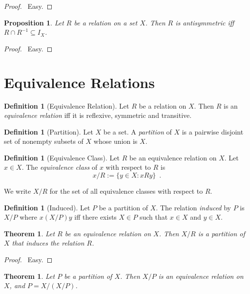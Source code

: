 \documentclass{report}
\let\qed\relax
\newtheorem{prop}[ax]{Proposition}
\newtheorem{thm}[ax]{Theorem}
\theoremstyle{definition}
\newtheorem{df}[ax]{Definition}
\begin{document}
\begin{proof}
\pf\ Easy. \qed
\end{proof}

\begin{prop}
Let $R$ be a relation on a set $X$. Then $R$ is antisymmetric iff $R \cap R^{-1} \subseteq I_X$.
\end{prop}

\begin{proof}
\pf\ Easy. \qed
\end{proof}

\section{Equivalence Relations}

\begin{df}[Equivalence Relation]
Let $R$ be a relation on $X$. Then $R$ is an \emph{equivalence relation} iff it is reflexive, symmetric and transitive.
\end{df}

\begin{df}[Partition]
Let $X$ be a set. A \emph{partition} of $X$ is a pairwise disjoint set of nonempty subsets of $X$ whose union is $X$.
\end{df}

\begin{df}[Equivalence Class]
Let $R$ be an equivalence relation on $X$. Let $x \in X$. The \emph{equivalence class} of $x$ with respect to $R$ is \[ x / R := \{ y \in X : x R y \} \enspace . \]

We write $X / R$ for the set of all equivalence classes with respect to $R$.
\end{df}

\begin{df}[Induced]
Let $P$ be a partition of $X$. The relation \emph{induced} by $P$ is $X/P$ where $x (X/P) y$ iff there exists $X \in P$ such that $x \in X$ and $y \in X$.
\end{df}

\begin{thm}
Let $R$ be an equivalence relation on $X$. Then $X / R$ is a partition of $X$ that induces the relation $R$.
\end{thm}

\begin{proof}
\pf\ Easy. \qed
\end{proof}

\begin{thm}
Let $P$ be a partition of $X$. Then $X / P$ is an equivalence relation on $X$, and $P = X / (X / P)$.
\end{thm}
\end{document}
